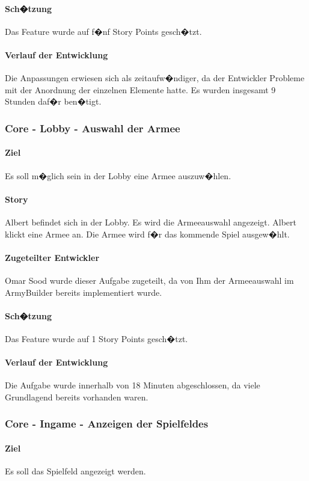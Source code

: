 \documentclass[12pt, titlepage]{scrartcl}
\begin{document}
		\paragraph{Sch�tzung}
		Das Feature wurde auf f�nf Story Points gesch�tzt.
		\paragraph{Verlauf der Entwicklung} 
		Die Anpassungen erwiesen sich als zeitaufw�ndiger, da der Entwickler Probleme mit der Anordnung der einzelnen Elemente hatte. Es wurden insgesamt 9 Stunden daf�r ben�tigt.
		
		\subsubsection{Core - Lobby - Auswahl der Armee }
		\paragraph{Ziel} Es soll m�glich sein in der Lobby eine Armee auszuw�hlen. 
		\paragraph{Story} Albert befindet sich in der Lobby. Es wird die Armeeauswahl angezeigt. Albert klickt eine Armee an. Die Armee wird f�r das kommende Spiel ausgew�hlt.
		\paragraph{Zugeteilter Entwickler} Omar Sood wurde dieser Aufgabe zugeteilt, da von Ihm der Armeeauswahl im ArmyBuilder bereits implementiert wurde.
		\paragraph{Sch�tzung}
		Das Feature wurde auf 1 Story Points gesch�tzt.
		\paragraph{Verlauf der Entwicklung} 
		Die Aufgabe wurde innerhalb von 18 Minuten abgeschlossen, da viele Grundlagend bereits vorhanden waren.
		
		\subsubsection{Core - Ingame - Anzeigen der Spielfeldes}
		\paragraph{Ziel} Es soll das Spielfeld angezeigt werden.
\end{document}
